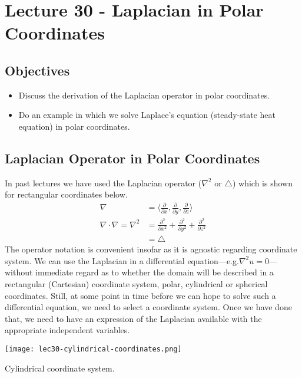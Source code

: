 \chapter{Lecture 30 - Laplacian in Polar Coordinates}
\label{ch:lec30}
\section{Objectives}
\begin{itemize}
\item Discuss the derivation of the Laplacian operator in polar coordinates.
\item Do an example in which we solve Laplace's equation (steady-state heat equation) in polar coordinates.
\end{itemize}
\setcounter{lstannotation}{0}

\section{Laplacian Operator in Polar Coordinates}

In past lectures we have used the Laplacian operator ($\nabla^2$ or $\bigtriangleup$) which is shown for rectangular coordinates below.
\begin{align*}
\nabla &= \langle \frac{\partial}{\partial x}, \frac{\partial}{\partial y}, \frac{\partial}{\partial z} \rangle \\
\nabla \cdot \nabla = \nabla^2 &= \frac{\partial^2}{\partial x^2} + \frac{\partial^2}{\partial y^2} + \frac{\partial^2}{\partial z^2} \\
&= \bigtriangleup
\end{align*}
The operator notation is convenient insofar as it is agnostic regarding coordinate system.  We can use the Laplacian in a differential equation---e.g.$\nabla^2u = 0$---without immediate regard as to whether the domain will be described in a rectangular (Cartesian) coordinate system, polar, cylindrical or spherical coordinates.  Still, at some point in time before we can hope to solve such a differential equation, we need to select a coordinate system.  Once we have done that, we need to have an expression of the Laplacian available with the appropriate independent variables.  
\begin{marginfigure}
\texttt{[image: lec30-cylindrical-coordinates.png]}
\caption{Cylindrical coordinate system.}
\label{fig:lec30-cylindrical-coordinates}
\end{marginfigure}

